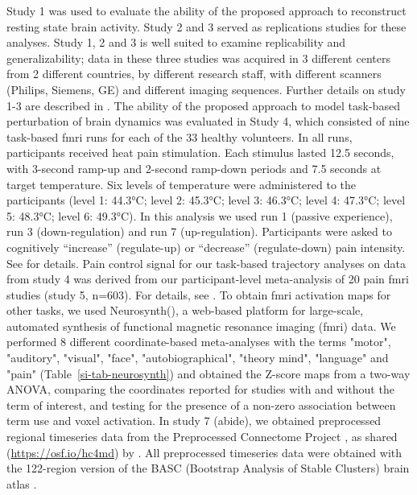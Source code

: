 \documentclass{article}
\begin{document}
Study 1 was used to evaluate the ability of the proposed approach to reconstruct resting state brain activity. Study 2 and 3 served as replications studies for these analyses. Study 1, 2 and 3 is well suited to examine replicability and generalizability; data in these three studies was acquired in 3 different centers from 2 different countries, by different research staff, with different scanners (Philips, Siemens, GE) and different imaging sequences. Further details on study 1-3 are described in \cite{Spisak_2020}. The ability of the proposed approach to model task-based perturbation of brain dynamics was evaluated in Study 4, which consisted of nine task-based \acrshort{fmri} runs for each of the 33 healthy volunteers. In all runs, participants received heat pain stimulation. Each stimulus lasted 12.5 seconds, with 3-second ramp-up and 2-second ramp-down periods and 7.5 seconds at target temperature. Six levels of temperature were a\acrshort{dm}inistered to the participants (level 1: 44.3°C; level 2: 45.3°C; level 3: 46.3°C; level 4: 47.3°C; level 5: 48.3°C; level 6: 49.3°C). In this analysis we used run 1 (passive experience),  run 3 (down-regulation) and run 7 (up-regulation). Participants were asked to cognitively ``increase'' (regulate-up) or ``decrease'' (regulate-down) pain intensity. See \citet{woo2015distinct} for details.
Pain control signal for our task-based trajectory analyses on data from study 4 was derived from our participant-level meta-analysis of 20 pain \acrshort{fmri} studies (study 5, n=603). For details, see \citet{zunhammer2021meta}.
To obtain \acrshort{fmri} activation maps for other tasks, we used Neurosynth(\cite{Tor_D__2011}), a web-based platform for large-scale, automated synthesis of functional magnetic resonance imaging (\acrshort{fmri}) data. We performed 8 different coordinate-based meta-analyses with the terms "motor", "auditory", "visual", "face", "autobiographical", "theory mind", "language" and "pain" (Table~\ref{si-tab-neurosynth}) and obtained the Z-score maps from a two-way ANOVA, comparing the coordinates reported for studies with and without the term of interest, and testing for the presence of a non-zero association between term use and voxel activation.
In study 7 (\acrshort{abide}), we obtained preprocessed regional timeseries data from the Preprocessed Connectome Project \citep{craddock2013towards}, as shared (\href{https://osf.io/hc4md}{https://osf.io/hc4md}) by \citet{dadi2019benchmarking}. All preprocessed timeseries data were obtained with the 122-region version of the BASC (Bootstrap Analysis of Stable Clusters) brain atlas \citep{bellec2010multi}.
\end{document}
